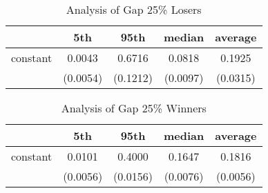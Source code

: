 \documentclass{article}
\begin{document}
\begin{table}
\caption{Analysis of Gap 25\% Losers}
\begin{center}
\begin{tabular}{lcccc}
\hline
         &   5th    &   95th   &  median  & average   \\
\midrule
\midrule
constant & 0.0043   & 0.6716   & 0.0818   & 0.1925    \\
         & (0.0054) & (0.1212) & (0.0097) & (0.0315)  \\
\hline
\end{tabular}
\end{center}
\end{table}

\begin{table}
\caption{Analysis of Gap 25\% Winners}
\begin{center}
\begin{tabular}{lcccc}
\hline
         &   5th    &   95th   &  median  & average   \\
\midrule
\midrule
constant & 0.0101   & 0.4000   & 0.1647   & 0.1816    \\
         & (0.0056) & (0.0156) & (0.0076) & (0.0056)  \\
\hline
\end{tabular}
\end{center}
\end{table}
\end{document}
